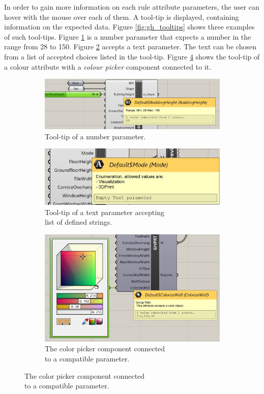 In order to gain more information on each rule attribute parameters, the user can hover with the mouse over each of them. A tool-tip is displayed, containing information on the expected data. Figure \ref{fig:gh_tooltips} shows three examples of such tool-tips. Figure \ref{fig:gh_sub_1} is a number parameter that expects a number in the range from 28 to 150. Figure \ref{fig:gh_sub_2} accepts a text parameter. The text can be chosen from a list of accepted choices listed in the tool-tip. Figure \ref{fig:gh_sub_3} shows the tool-tip of a colour attribute with a \textit{colour picker} component connected to it.

\newpage

\begin{figure}[h]
    
    \begin{subfigure}{0.5\textwidth}
        \includegraphics[width=0.9\linewidth]{res/man_gh_input_tooltips.jpg}
        \caption{Tool-tip of a number parameter.}
        \label{fig:gh_sub_1}
    \end{subfigure}
    \begin{subfigure}{0.5\textwidth}
        \includegraphics[width=0.9\linewidth]{res/man_gh_enum_tooltip.jpg}
        \caption{Tool-tip of a text parameter accepting\\ list of defined strings.}
        \label{fig:gh_sub_2}
    \end{subfigure}
    \begin{subfigure}{0.5\textwidth}
        \includegraphics[width=0.9\linewidth]{res/man_gh_color_input.jpg}
        \caption{The color picker component connected\\ to a compatible parameter.}
        \label{fig:gh_sub_3}
    \end{subfigure}
    

\end{figure}

